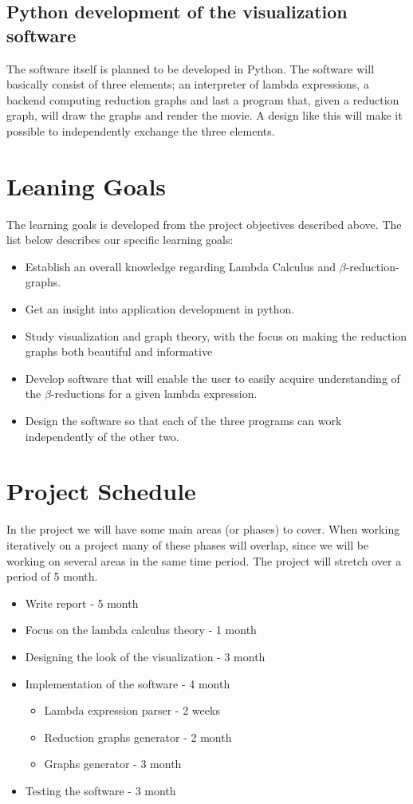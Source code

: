 \documentclass[11pt,oneside,a4paper]{article}
\begin{document}
\subsection{Python development of the visualization software}	
The software itself is planned to be developed in Python. The software will basically consist of three elements; an interpreter of lambda expressions, a backend computing reduction graphs and last a program that, given a reduction graph, will draw the graphs and render the movie. A design like this will make it possible to independently exchange the three elements.

\section{Leaning Goals}
The learning goals is developed from the project objectives described above. The list below describes our specific learning goals:
\begin{itemize}
	\item Establish an overall knowledge regarding Lambda Calculus and $\beta$-reduction-graphs.
	\item Get an insight into application development in python.
	\item Study visualization and graph theory, with the focus on making the reduction graphs both beautiful and informative
	\item Develop software that will enable the user to easily acquire understanding of the $\beta$-reductions for a given lambda expression.
	\item Design the software so that each of the three programs can work independently of the other two.
\end{itemize}


\section{Project Schedule}
In the project we will have some main areas (or phases) to cover. When working iteratively on a project many of these phases will overlap, since we will be working on several areas in the same time period. The project will stretch over a period of 5 month.
\begin{itemize}
	\item Write report - 5 month
	\item Focus on the lambda calculus theory - 1 month
	\item Designing the look of the visualization - 3 month
	\item Implementation of the software - 4 month
	\begin{itemize}
		\item[-] Lambda expression parser - 2 weeks
		\item[-] Reduction graphs generator - 2 month
		\item[-] Graphs generator - 3 month
	\end{itemize}
	\item Testing the software - 3 month
\end{itemize}
\end{document}
